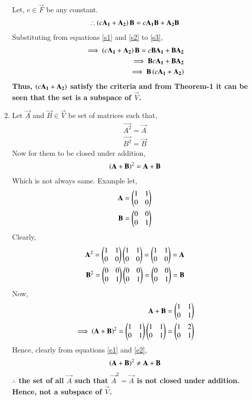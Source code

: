 \documentclass[journal,12pt,twocolumn]{IEEEtran}
\begin{document}
\begin{enumerate}
Let, c$\in \vec{F}$ be any constant.   
\begin{align}
\therefore \left(c\mathbf{A_1}+\mathbf{A_2}\right)\mathbf{B} = c\mathbf{A_1B} +\mathbf{A_2B}\label{s3}
\end{align}
Substituting from equations \eqref{s1} and \eqref{s2} to \eqref{s3},
\begin{align}
\implies \left(c\mathbf{A_1}+\mathbf{A_2}\right)\mathbf{B} = c\mathbf{BA_1} +\mathbf{BA_2}\\
\implies \mathbf{B}c\mathbf{A_1} +\mathbf{BA_2}\\
\implies \mathbf{B}\left(c\mathbf{A_1}+\mathbf{A_2}\right)
\end{align}
\textbf{Thus, $\left(c\mathbf{A_1}+\mathbf{A_2}\right)$ satisfy the criteria and from Theorem-1 it can be seen that the set is a subspace of $\vec{V}$.} 
\item Let $\vec{A}$ and $\vec{B} \in \vec{V}$ be set of matrices such that,
\begin{align}
\vec{A^2}=\vec{A}\\
\vec{B^2}=\vec{B}
\end{align}
Now for them to be closed under addition,
\begin{align}
\left(\mathbf{A+B}\right)^2 = \mathbf{A+B}
\end{align} 
Which is not always same. Example let,
\begin{align}
\mathbf{A} = \begin{pmatrix}1&1\\0&0\end{pmatrix}\\
\mathbf{B} = \begin{pmatrix}0&0\\0&1\end{pmatrix}
\end{align}
Clearly,
\begin{align}
\mathbf{A}^2 = \begin{pmatrix}1&1\\0&0\end{pmatrix}\begin{pmatrix}1&1\\0&0\end{pmatrix} = \begin{pmatrix}1&1\\0&0\end{pmatrix} = \mathbf{A}\\
\mathbf{B}^2 =\begin{pmatrix}0&0\\0&1\end{pmatrix}\begin{pmatrix}0&0\\0&1\end{pmatrix} = \begin{pmatrix}0&0\\0&1\end{pmatrix} = \mathbf{B}
\end{align}
Now, 
\begin{align}
\mathbf{A+B} = \begin{pmatrix}1&1\\0&1\end{pmatrix}\label{e1}\\
\implies \left(\mathbf{A+B}\right)^2 = \begin{pmatrix}1&1\\0&1\end{pmatrix}\begin{pmatrix}1&1\\0&1\end{pmatrix} = \begin{pmatrix}1&2\\0&1\end{pmatrix}\label{e2}
\end{align}
Hence, clearly from equations \eqref{e1} and \eqref{e2},
\begin{align}
\left(\mathbf{A+B}\right)^2 \neq \mathbf{A+B}
\end{align}
\textbf{$\therefore$ the set of all $\vec{A}$ such that $\vec{A}^2=\vec{A}$ is not closed under addition. Hence, not a subspace of $\vec{V}$.}
\end{enumerate}
\end{document}
